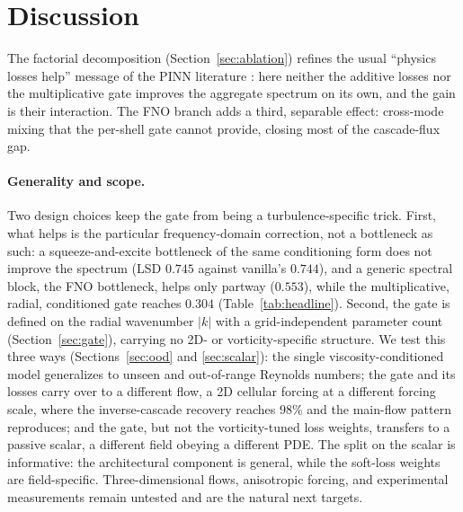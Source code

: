 \documentclass[10pt]{article} %
\begin{document}
\section{Discussion}

The factorial decomposition (Section~\ref{sec:ablation}) refines the usual ``physics losses help'' message of the PINN literature \citep{raissi2019physics}: here neither the additive losses nor the multiplicative gate improves the aggregate spectrum on its own, and the gain is their interaction. The FNO branch adds a third, separable effect: cross-mode mixing that the per-shell gate cannot provide, closing most of the cascade-flux gap.

\paragraph{Generality and scope.} Two design choices keep the gate from being a turbulence-specific trick. First, what helps is the particular frequency-domain correction, not a bottleneck as such: a squeeze-and-excite bottleneck of the same conditioning form does not improve the spectrum (LSD $0.745$ against vanilla's $0.744$), and a generic spectral block, the FNO bottleneck, helps only partway ($0.553$), while the multiplicative, radial, conditioned gate reaches $0.304$ (Table~\ref{tab:headline}). Second, the gate is defined on the radial wavenumber $|k|$ with a grid-independent parameter count (Section~\ref{sec:gate}), carrying no 2D- or vorticity-specific structure. We test this three ways (Sections~\ref{sec:ood} and \ref{sec:scalar}): the single viscosity-conditioned model generalizes to unseen and out-of-range Reynolds numbers; the gate and its losses carry over to a different flow, a 2D cellular forcing at a different forcing scale, where the inverse-cascade recovery reaches $98\%$ and the main-flow pattern reproduces; and the gate, but not the vorticity-tuned loss weights, transfers to a passive scalar, a different field obeying a different PDE. The split on the scalar is informative: the architectural component is general, while the soft-loss weights are field-specific. Three-dimensional flows, anisotropic forcing, and experimental measurements remain untested and are the natural next targets.
\end{document}
